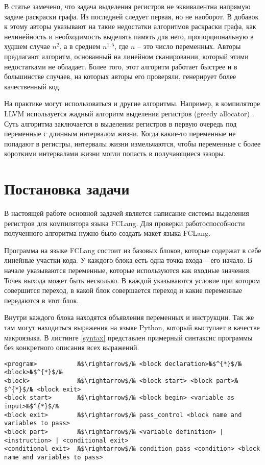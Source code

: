 \documentclass[a4paper,14pt]{extarticle}
\begin{document}
В статье \cite{krishnamurthi_extended_2007} замечено, что задача выделения регистров не эквивалентна напрямую задаче раскраски графа.
Из последней следует первая, но не наоборот.
В добавок к этому авторы указывают на такие недостатки алгоритмов раскраски графа,
как нелинейность и необходимость выделять память для него,
пропорциональную в худшем случае $n^2$, а в среднем $n^{1,5}$, где $n$ -- это число переменных.
Авторы предлагают алгоритм, основанный на линейном сканировании, который этими недостатками не обладает.
Более того, этот алгоритм работает быстрее и в большинстве случаев, на которых авторы его проверяли, генерирует более качественный код.

На практике могут использоваться и другие алгоритмы.
Например, в компиляторе LLVM используется жадный алгоритм выделения регистров (greedy allocator) \cite{llvm_greedy_2011}.
Суть алгоритма заключается в выделении регистров в первую очередь под переменные с длинным интервалом жизни.
Когда какие-то переменные не попадают в регистры, интервалы жизни измельчаются, чтобы переменные с более короткими интервалами жизни могли попасть в получающиеся зазоры.


\section{Постановка задачи}

В настоящей работе основной задачей является написание системы выделения регистров для компилятора языка FCLang.
Для проверки работоспособности полученного алгоритма нужно было создать макет языка FCLang.

Программа на языке FCLang состоит из базовых блоков, которые содержат в себе линейные участки кода.
У каждого блока есть одна точка входа -- его начало.
В начале указываются переменные, которые используются как входные значения.
Точек выхода может быть несколько.
В каждой указываются условие при котором совершится переход, в какой блок совершается переход и какие переменные передаются в этот блок.

Внутри каждого блока находятся объявления переменных и инструкции.
Так же там могут находиться выражения на языке Python, который выступает в качестве макроязыка.
В листинге \ref{syntax} представлен примерный синтаксис программы без конкретного описания всех выражений.

\begin{lstlisting}[caption=Синтаксис программы на FCLang, label=syntax]
<program>           №$\rightarrow$/№ <block declaration>№$^{*}$/№ <block>№$^{*}$/№
<block>             №$\rightarrow$/№ <block start> <block part>№$^{*}$/№ <block exit>
<block start>       №$\rightarrow$/№ <block begin> <variable as input>№$^{*}$/№
<block exit>        №$\rightarrow$/№ pass_control <block name and variables to pass>
<block part>        №$\rightarrow$/№ <variable definition> | <instruction> | <conditional exit>
<conditional exit>  №$\rightarrow$/№ condition_pass <condition> <block name and variables to pass>
\end{lstlisting}
\end{document}
